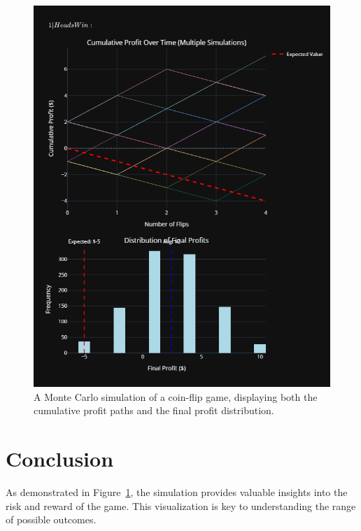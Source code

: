 \documentclass{article}
\begin{document}
\begin{figure}[!htbp]
    \centering
    
    \includegraphics[width=\textwidth]{coin_flip_simulation.png}
    
    \caption{A Monte Carlo simulation of a coin-flip game, displaying both the cumulative profit paths and the final profit distribution.}
    \label{fig:coin_simulation}
\end{figure}

\section{Conclusion}

As demonstrated in Figure~\ref{fig:coin_simulation}, the simulation provides valuable insights into the risk and reward of the game. This visualization is key to understanding the range of possible outcomes.
\end{document}
